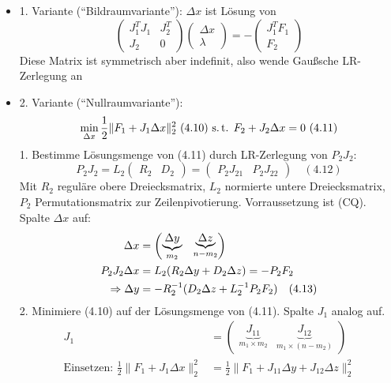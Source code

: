 
\begin{itemize}
\item 1. Variante ("`Bildraumvariante"'): $\Delta x$ ist Lösung von 
\[ \begin{pmatrix} J_1^T J_1 & J_2^T \\ J_2 & 0 \end{pmatrix} \begin{pmatrix} \Delta x \\ \lambda \end{pmatrix} = - \begin{pmatrix} J_1^T F_1 \\ F_2 \end{pmatrix} \]
Diese Matrix ist symmetrisch aber indefinit, also wende Gaußsche LR-Zerlegung an
\item 2. Variante ("`Nullraumvariante"'): %
\[ \min_{\Delta x} \frac 12 \| F_1 + J_1 \Delta x\|_2^2 \text{ (4.10) s.\,t. } F_2 + J_2 \Delta x = 0 \text{ (4.11)} \]
1. Bestimme Lösungsmenge von (4.11) durch LR-Zerlegung von $P_2 J_2$:
\[ P_2 J_2 = L_2 \begin{pmatrix} R_2 & D_2 \end{pmatrix} = \begin{pmatrix} P_2 J_{21} & P_2 J_{22} \end{pmatrix} \quad (4.12)\]
Mit $R_2$ reguläre obere Dreiecksmatrix, $L_2$ normierte untere Dreiecksmatrix, $P_2$ Permutationsmatrix zur Zeilenpivotierung. Vorraussetzung ist (CQ). Spalte $\Delta x$ auf: 
\begin{align*}
\Delta x &= \begin{pmatrix}\underbrace{ \Delta y}_{m_2} & \underbrace{\Delta z}_{n-m_2} \end{pmatrix} \\
P_2 J_2 \Delta x &= L_2( R_2 \Delta y + D_2 \Delta z) = - P_2 F_2 \\
\Rightarrow \Delta y &= - R_2^{-1} ( D_2 \Delta z + L_2^{-1} P_2 F_2) \quad (4.13) \\
\end{align*}
2. Minimiere (4.10) auf der Lösungsmenge von (4.11). Spalte $J_1$ analog auf.
\begin{align*}
J_1 &= \begin{pmatrix}\underbrace{ J_{11}}_{m_1 \times m_2} & \underbrace{J_{12}}_{m_1 \times (n-m_2)} \end{pmatrix} \\
\text{Einsetzen: } \frac 12 \| F_1 + J_1 \Delta x \|_2^2 &= \frac 12 \|F_1 + J_{11} \Delta y + J_{12} \Delta z \|_2^2 \\

\end{align*}
\end{itemize}
